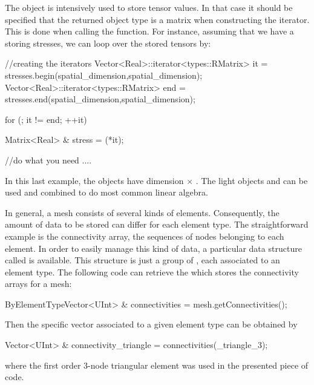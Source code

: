 The  object is intensively used to store tensor values.  In that
case it should be specified that the returned object type is a matrix when
constructing the iterator. This is done when calling the  function. For
instance, assuming that we have a  storing stresses, we can loop
over the stored tensors by:

\begin{cpp}
  //creating the iterators
  Vector<Real>::iterator<types::RMatrix> it  = stresses.begin(spatial_dimension,spatial_dimension);
  Vector<Real>::iterator<types::RMatrix> end = stresses.end(spatial_dimension,spatial_dimension);

  for (; it != end; ++it){
    Matrix<Real> & stress = (*it);

    //do what you need
    ....
  }
\end{cpp}
In this last example, the  objects have dimension
 $\times$ .
The light objects  and  can be used and combined
to do most common linear algebra.

In general, a mesh consists of several kinds of elements. Consequently, the
amount of data to be stored can differ for each element type. The straightforward
example is the connectivity array, \ie the sequences of nodes belonging to
each element. In order to easily manage this kind of data, a
particular data structure called  is available.
This structure is just a group of , each associated to an element
type. The following code can retrieve the 
which stores the connectivity arrays for a mesh:
\begin{cpp}
  ByElementTypeVector<UInt> & connectivities = mesh.getConnectivities();
\end{cpp}
Then the specific vector associated to a given element type can be
obtained by
\begin{cpp}
  Vector<UInt> & connectivity_triangle = connectivities(_triangle_3);
\end{cpp}
where the first order 3-node triangular element was used in the presented
piece of code.

